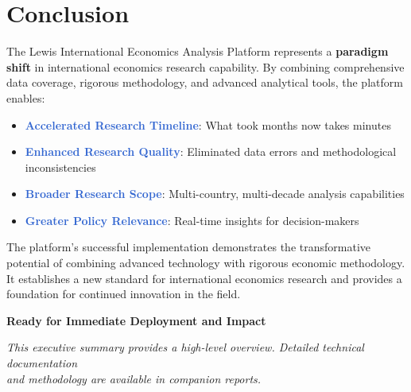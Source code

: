 \documentclass[11pt,a4paper]{article}
\begin{document}
\section{Conclusion}

The Lewis International Economics Analysis Platform represents a \textbf{paradigm shift} in international economics research capability. By combining comprehensive data coverage, rigorous methodology, and advanced analytical tools, the platform enables:

\begin{itemize}
    \item \textcolor{highlight}{\textbf{Accelerated Research Timeline}}: What took months now takes minutes
    \item \textcolor{highlight}{\textbf{Enhanced Research Quality}}: Eliminated data errors and methodological inconsistencies
    \item \textcolor{highlight}{\textbf{Broader Research Scope}}: Multi-country, multi-decade analysis capabilities
    \item \textcolor{highlight}{\textbf{Greater Policy Relevance}}: Real-time insights for decision-makers
\end{itemize}

The platform's successful implementation demonstrates the transformative potential of combining advanced technology with rigorous economic methodology. It establishes a new standard for international economics research and provides a foundation for continued innovation in the field.

\begin{center}
\textbf{\large Ready for Immediate Deployment and Impact}
\end{center}

\vspace{0.5cm}

\begin{center}
\textit{This executive summary provides a high-level overview. Detailed technical documentation\\and methodology are available in companion reports.}
\end{center}
\end{document}

